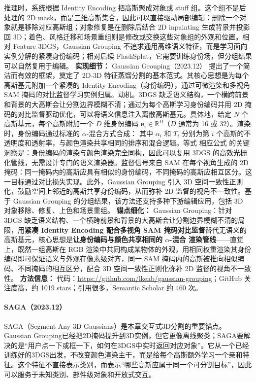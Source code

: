 推理时，系统根据 Identity Encoding 把高斯聚成对象或 stuff 组。这个组不是后处理的 2D mask，而是三维高斯集合，因此可以直接驱动局部编辑：删除一个对象就是移除对应高斯组；对象修复是在删除后结合 2D inpainting 生成背景并投影回 3D；着色、风格迁移和场景重组则是修改或交换这些对象组的外观和位置。相对 Feature 3DGS，Gaussian Grouping 不追求通用高维语义特征，而是学习面向实例分解的紧凑身份编码；相对后续 FlashSplat，它需要训练身份场，但分组结果可以自然复用于编辑。
\textbf{实现细节：} Gaussian Grouping（2023.12） 提出了一个简洁而有效的框架，奠定了 2D-3D 特征蒸馏分割的基本范式。其核心思想是为每个高斯基元附加一个紧凑的 Identity Encoding（身份编码），通过可微渲染和多视角 SAM 掩码的对比监督学习实例归属。动机。3DGS 缺乏语义结构，一个横跨前景和背景的大高斯会让分割边界模糊不清；通过为每个高斯学习身份编码并用 2D 掩码的对比监督驱动优化，可以将语义信息注入离散高斯基元。具体地，给定 $N$ 个高斯基元，每个高斯附加一个 $D$ 维身份编码 $\mathbf{e}_i \in \mathbb{R}^D$（$D$ 通常为 16 或 32）。渲染时，身份编码通过标准的 $\alpha$-混合方式合成： 其中 $\alpha_i$ 和 $T_i$ 分别为第 $i$ 个高斯的不透明度和透射率，与颜色渲染共享相同的排序和混合逻辑。等式 相应公式 的关键洞察是：身份编码的渲染与颜色渲染完全同构，因此可以复用 3DGS 的高效光栅化管线，无需设计专门的语义渲染器。监督信号来自 SAM 在每个视角生成的 2D 掩码：同一掩码内的高斯应具有相似的身份编码，不同掩码的高斯应相互区分。这一目标通过对比损失实现。此外，Gaussian Grouping 引入 3D 空间一致性正则化，鼓励空间上邻近的高斯共享身份编码，从而弥补 2D 监督的视角不一致性。基于 Gaussian Grouping 的分组结果，该方法还支持多种下游编辑应用，包括 3D 对象移除、修复、上色和场景重组。
\textbf{锚点细化：} Gaussian Grouping：针对 3DGS 缺乏语义结构、一个横跨前景和背景的大高斯会让分割边界模糊不清的局限，用\textbf{紧凑 Identity Encoding 配合多视角 SAM 掩码对比监督}替代无语义的高斯基元，核心思想是\textbf{让身份编码与颜色共享相同的 $\alpha$-混合 渲染管线}——直觉上，既然一组高斯在 RGB 渲染中共同构成某物体的外观，用相同权重渲染其身份编码即可保证语义与外观在像素级对齐，同一 SAM 掩码内的高斯被推向相似编码、不同掩码的相互区分，配合 3D 空间一致性正则化弥补 2D 监督的视角不一致性。
\textbf{方法信息：} 代码：\url{https://github.com/lkeab/gaussian-grouping}；GitHub 关注度高，约 1019 stars；引用很多，Semantic Scholar 约 460 次。



\paragraph{SAGA（2023.12）\cite{2312_00860}}
SAGA（Segment Any 3D Gaussians）是本章交互式3D分割的重要锚点。Gaussian Grouping已经把2D掩码提升到3D实例，但它更像离线聚类；SAGA要解决的是“用户点一下或框一下，如何在3DGS中实时返回对应对象”。它从一个已经训练好的3DGS出发，不改变颜色渲染主干，而是给每个高斯额外学习一个亲和特征。这个特征不直接表示类别，而表示“哪些高斯应属于同一个可分割目标”，因此可以服务于未知类别、部件级对象和开放式交互。

